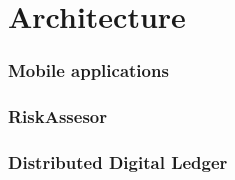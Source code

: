 {\color{PineGreen}\section{Architecture}}


{\color{PineGreen}\subsubsection{Mobile applications}}
{\color{PineGreen}\subsubsection{RiskAssesor}}
{\color{PineGreen}\subsubsection{Distributed Digital Ledger}}
